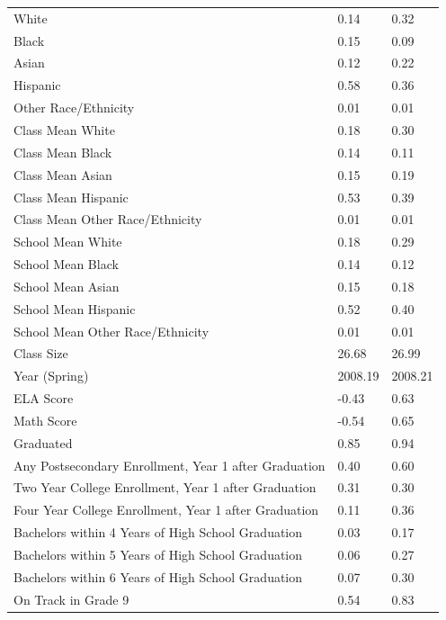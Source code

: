 \documentclass[12pt]{article}
\theoremstyle{definition}
\theoremstyle{definition}
\theoremstyle{definition}
\theoremstyle{definition}
\begin{document}
\begin{table}[]
\begin{tabular}{lll}
White                                                   & 0.14    & 0.32    \\
Black                                                   & 0.15    & 0.09    \\
Asian                                                   & 0.12    & 0.22    \\
Hispanic                                                & 0.58    & 0.36    \\
Other Race/Ethnicity                                    & 0.01    & 0.01    \\
Class Mean White                                        & 0.18    & 0.30    \\
Class Mean Black                                        & 0.14    & 0.11    \\
Class Mean Asian                                        & 0.15    & 0.19    \\
Class Mean Hispanic                                     & 0.53    & 0.39    \\
Class Mean Other   Race/Ethnicity                       & 0.01    & 0.01    \\
School Mean White                                       & 0.18    & 0.29    \\
School Mean Black                                       & 0.14    & 0.12    \\
School Mean Asian                                       & 0.15    & 0.18    \\
School Mean Hispanic                                    & 0.52    & 0.40    \\
School Mean Other   Race/Ethnicity                      & 0.01    & 0.01    \\
Class Size                                              & 26.68   & 26.99   \\
Year (Spring)                                           & 2008.19 & 2008.21 \\
ELA Score                                               & -0.43   & 0.63    \\
Math Score                                              & -0.54   & 0.65    \\
Graduated                                               & 0.85    & 0.94    \\
Any Postsecondary Enrollment,   Year 1 after Graduation & 0.40    & 0.60    \\
Two Year College Enrollment,   Year 1 after Graduation  & 0.31    & 0.30    \\
Four Year College Enrollment,   Year 1 after Graduation & 0.11    & 0.36    \\
Bachelors within 4 Years of   High School Graduation    & 0.03    & 0.17    \\
Bachelors within 5 Years of   High School Graduation    & 0.06    & 0.27    \\
Bachelors within 6 Years of   High School Graduation    & 0.07    & 0.30    \\
On Track in Grade 9                                     & 0.54    & 0.83   
\end{tabular}
\end{table}
\end{document}
